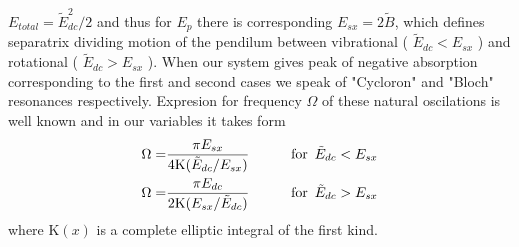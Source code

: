 \documentclass[40pt,letterpaper,physrev]{article}
\begin{document}
    $E_{total}=\tilde{E}_{dc}^2/2$ and thus for $E_p$ there is 
    corresponding $E_{sx}=2\tilde{B}$, which defines separatrix dividing
    motion of the pendilum between vibrational 
    ( $\tilde{E}_{dc}<E_{sx}$ ) and 
    rotational ( $\tilde{E}_{dc}>E_{sx}$ ).
    When our system gives peak of negative absorption corresponding 
    to the first and second cases we speak of "Cycloron" and 
    "Bloch" resonances respectively. Expresion for frequency 
    $\Omega$ of these natural oscilations is well known and in our 
    variables it takes form
    \begin{alignat}{2}
    \Omega=&\frac{\pi E_{sx}}{4\text{K}(\tilde{E}_{dc}/E_{sx})} &\qquad \text{for} \enskip \tilde{E}_{dc}<E_{sx}\\
    \Omega=&\frac{\pi E_{dc}}{2\text{K}(E_{sx}/\tilde{E}_{dc})}
     &\qquad \text{for} \enskip \tilde{E}_{dc}>E_{sx}
    \end{alignat}
    where $\text{K}(x)$ is a complete elliptic integral of the 
    first kind.
\end{document}

